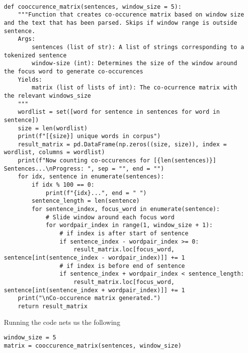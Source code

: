 \documentclass[12pt, letterpaper]{article}
\begin{document}
\begin{mdframed}[backgroundcolor=shadecolor]
\begin{verbatim}

def cooccurence_matrix(sentences, window_size = 5):
    """Function that creates co-occurence matrix based on window size and the text that has been parsed. Skips if window range is outside sentence.
    Args:
        sentences (list of str): A list of strings corresponding to a tokenized sentence
        window-size (int): Determines the size of the window around the focus word to generate co-occurences
    Yields:
        matrix (list of lists of int): The co-ocurrence matrix with the relevant windows_size
    """
    wordlist = set([word for sentence in sentences for word in sentence])
    size = len(wordlist)
    print(f"[{size}] unique words in corpus")
    result_matrix = pd.DataFrame(np.zeros((size, size)), index = wordlist, columns = wordlist)
    print(f"Now counting co-occurences for [{len(sentences)}] Sentences...\nProgress: ", sep = "", end = "")
    for idx, sentence in enumerate(sentences):
        if idx % 100 == 0:
            print(f"{idx}...", end = " ")
        sentence_length = len(sentence)
        for sentence_index, focus_word in enumerate(sentence):
            # Slide window around each focus word
            for wordpair_index in range(1, window_size + 1):
                # if index is after start of sentence
                if sentence_index - wordpair_index >= 0:
                    result_matrix.loc[focus_word, sentence[int(sentence_index - wordpair_index)]] += 1
                # if index is before end of sentence
                if sentence_index + wordpair_index < sentence_length:
                    result_matrix.loc[focus_word, sentence[int(sentence_index + wordpair_index)]] += 1
    print("\nCo-occurence matrix generated.")
    return result_matrix

\end{verbatim}
\end{mdframed}

Running the code nets us the following

\begin{mdframed}[backgroundcolor=shadecolor]
\begin{verbatim}
window_size = 5
matrix = cooccurence_matrix(sentences, window_size)
\end{verbatim}
\end{mdframed}
\end{document}
